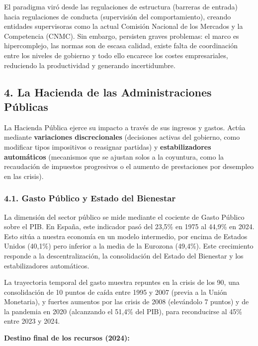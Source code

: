 El paradigma viró desde las regulaciones de estructura (barreras de entrada) hacia regulaciones de conducta (supervisión del comportamiento), creando entidades supervisoras como la actual Comisión Nacional de los Mercados y la Competencia (CNMC). Sin embargo, persisten graves problemas: el marco es hipercomplejo, las normas son de escasa calidad, existe falta de coordinación entre los niveles de gobierno y todo ello encarece los costes empresariales, reduciendo la productividad y generando incertidumbre.

\subsection*{4. La Hacienda de las Administraciones Públicas}

La Hacienda Pública ejerce su impacto a través de sus ingresos y gastos. Actúa mediante \textbf{variaciones discrecionales} (decisiones activas del gobierno, como modificar tipos impositivos o reasignar partidas) y \textbf{estabilizadores automáticos} (mecanismos que se ajustan solos a la coyuntura, como la recaudación de impuestos progresivos o el aumento de prestaciones por desempleo en las crisis).

\subsubsection*{4.1. Gasto Público y Estado del Bienestar}

La dimensión del sector público se mide mediante el cociente de Gasto Público sobre el PIB. En España, este indicador pasó del 23,5\% en 1975 al 44,9\% en 2024. Esto sitúa a nuestra economía en un modelo intermedio, por encima de Estados Unidos (40,1\%) pero inferior a la media de la Eurozona (49,4\%). Este crecimiento responde a la descentralización, la consolidación del Estado del Bienestar y los estabilizadores automáticos.

La trayectoria temporal del gasto muestra repuntes en la crisis de los 90, una consolidación de 10 puntos de caída entre 1995 y 2007 (previa a la Unión Monetaria), y fuertes aumentos por las crisis de 2008 (elevándolo 7 puntos) y de la pandemia en 2020 (alcanzando el 51,4\% del PIB), para reconducirse al 45\% entre 2023 y 2024.

\textbf{Destino final de los recursos (2024):}


